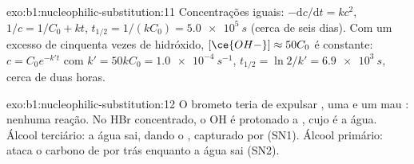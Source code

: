 \begin{solution}{exo:b1:nucleophilic-substitution:11}
Concentrações iguais: $-\mathrm{d}c/\mathrm{d}t = kc^2$, $1/c = 1/C_0 + kt$,
$t_{1/2} = 1/(kC_0) = \qty{5.0e5}{s}$ (cerca de seis dias). Com um
excesso de cinquenta vezes de hidróxido, $[\ce{OH-}] \approx 50C_0$ é
constante: $c = C_0
e^{-k't}$ com $k' = 50kC_0 = \qty{1.0e-4}{s^{-1}}$, $t_{1/2} = \ln 2/k' =
\qty{6.9e3}{s}$, cerca de duas horas.
\end{solution}

\begin{solution}{exo:b1:nucleophilic-substitution:12}
O brometo teria de expulsar , uma  e um mau : nenhuma reação. No HBr concentrado, o OH é protonado a
, cujo  é a água. Álcool terciário: a água sai,
dando o , capturado por  (SN1). Álcool primário:
 ataca o carbono de  por trás enquanto a água sai
(SN2).
\end{solution}

